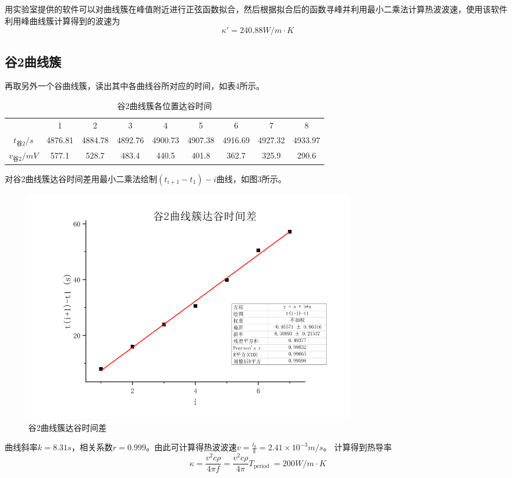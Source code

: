 \documentclass{article}
\begin{document}
    用实验室提供的软件可以对曲线簇在峰值附近进行正弦函数拟合，然后根据拟合后的函数寻峰并利用最小二乘法计算热波波速，使用该软件利用峰曲线簇计算得到的波速为
    $$\kappa'=240.88W/m\cdot K$$

    \subsection{谷2曲线簇}
    再取另外一个谷曲线簇，读出其中各曲线谷所对应的时间，如表4所示。

    \begin{table}[h]
        \centering
        \caption{谷2曲线簇各位置达谷时间}
        \vspace{1ex}
        \begin{tabular}{ccccccccc}
            \hline
                  & 1     & 2     & 3     & 4     & 5     & 6     & 7     & 8 \bigstrut[t]\\
            $t_{\text{谷}2}/s$ & 4876.81  & 4884.78  & 4892.76  & 4900.73  & 4907.38  & 4916.69  & 4927.32  & 4933.97  \\
            $v_{\text{谷}2}/mV$ & 577.1  & 528.7  & 483.4  & 440.5  & 401.8  & 362.7  & 325.9  & 290.6  \bigstrut[b]\\
            \hline
        \end{tabular}%
    \end{table}

    对谷2曲线簇达谷时间差用最小二乘法绘制$\left(t_{i+1}-t_{1} \right)-i$曲线，如图3所示。
    \begin{figure}[h]
        \centering
        \includegraphics[width=0.7\textwidth]{谷2.jpg}
        \caption{谷2曲线簇达谷时间差}
    \end{figure}

    曲线斜率$k=8.31s$，相关系数$r=0.999$。由此可计算得热波波速$v=\frac{l_0}{k}=2.41\times 10^{-3}m/s$。
    计算得到热导率
    $$\kappa=\frac{v^{2} c \rho}{4 \pi f}=\frac{v^{2} c \rho}{4 \pi} T_{\text {period }}=200W/m\cdot K$$
\end{document}
